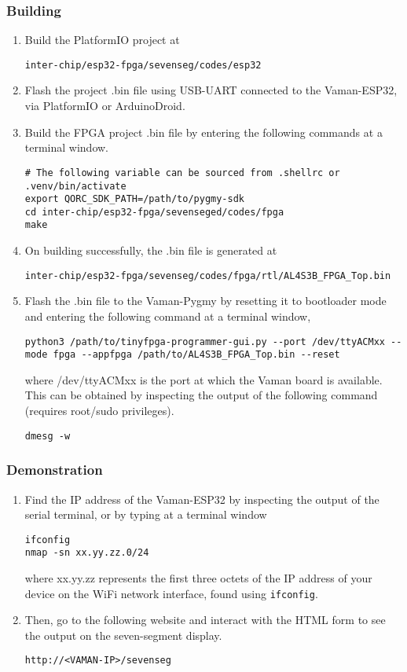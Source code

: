 \subsubsection{Building}
\begin{enumerate}
    \item Build the PlatformIO project at
    \begin{lstlisting}
inter-chip/esp32-fpga/sevenseg/codes/esp32
    \end{lstlisting}
    \item Flash the project .bin file using USB-UART connected to the 
    Vaman-ESP32, via PlatformIO or ArduinoDroid.
    \item Build the FPGA project .bin file by entering the following commands at
    a terminal window.
    \begin{lstlisting}
# The following variable can be sourced from .shellrc or .venv/bin/activate
export QORC_SDK_PATH=/path/to/pygmy-sdk
cd inter-chip/esp32-fpga/sevenseged/codes/fpga
make
    \end{lstlisting}
    \item On building successfully, the .bin file is generated at
    \begin{lstlisting}
inter-chip/esp32-fpga/sevenseg/codes/fpga/rtl/AL4S3B_FPGA_Top.bin
    \end{lstlisting}
    \item Flash the .bin file to the Vaman-Pygmy by resetting it to bootloader
    mode and entering the following command at a terminal window,
    \begin{lstlisting}
python3 /path/to/tinyfpga-programmer-gui.py --port /dev/ttyACMxx --mode fpga --appfpga /path/to/AL4S3B_FPGA_Top.bin --reset
    \end{lstlisting}
    where /dev/ttyACMxx is the port at which the Vaman board is available. This
    can be obtained by inspecting the output of the following command (requires
    root/sudo privileges).
    \begin{lstlisting}
dmesg -w
    \end{lstlisting}
\end{enumerate}

\subsubsection{Demonstration}
\begin{enumerate}[resume]
    \item Find the IP address of the Vaman-ESP32 by inspecting the output of the
    serial terminal, or by typing at a terminal window
    \begin{lstlisting}
ifconfig
nmap -sn xx.yy.zz.0/24
    \end{lstlisting}
    where xx.yy.zz represents the first three octets of the IP address of your
    device on the WiFi network interface, found using \texttt{ifconfig}.
    \item Then, go to the following website and interact with the HTML form to
    see the output on the seven-segment display.
    \begin{lstlisting}
http://<VAMAN-IP>/sevenseg
    \end{lstlisting}
\end{enumerate}

